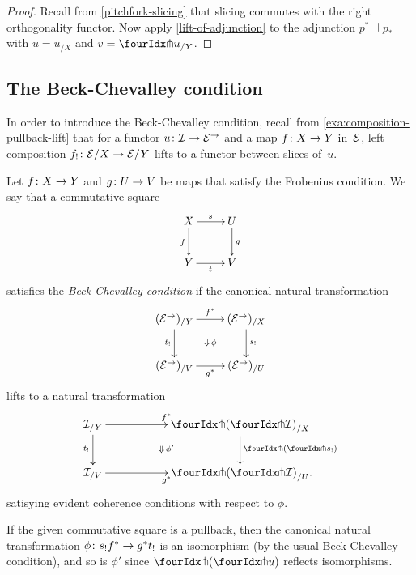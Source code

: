 \documentclass[reqno,10pt,a4paper,oneside]{amsart}
\begin{document}
\begin{proof}
Recall from \cref{pitchfork-slicing} that slicing commutes with the right orthogonality functor.
Now apply \cref{lift-of-adjunction} to the adjunction $p^* \dashv p_*$ with $u = u_{/X}$ and $v = {\liftr{u}}_{/Y}$.
\end{proof}


\subsection*{The Beck-Chevalley condition}
In order to introduce the Beck-Chevalley condition, recall from \cref{exa:composition-pullback-lift} that for a functor $u \colon \mathcal{I} \to \mathcal{E}^\to$ and a map $f \colon X \to Y$ in~$\mathcal{E}$, left composition $f_! \colon \mathcal{E}/X \to \mathcal{E}/Y$ lifts to a functor between slices of~$u$.



\begin{definition} \label{def:beck-chevalley}
Let $f \colon X \to Y$ and $g \colon U \to V$ be maps that satisfy the Frobenius condition.
We say that a commutative square
\[
\xymatrix{
  X
  \ar[d]_{f}
  \ar[r]^{s}
&
  U
  \ar[d]^{g}
\\
  Y
  \ar[r]_{t}
&
  V
}
\]
satisfies the \emph{Beck-Chevalley condition} if the canonical natural transformation
\[
\xymatrix{
  (\cal{E}^\to)_{/Y}
   \ar[d]_{t_!}
  \ar[r]^{f^*} \ar@{}[dr]|{\Downarrow \, \phi}
&
  (\cal{E}^\to)_{/X}
  \ar[d]^{s_!}
\\
  (\cal{E}^\to)_{/V}
  \ar[r]_{g^*}
&
  (\cal{E}^\to)_{/U}
}
\]
lifts to a natural transformation
\[
\xymatrix@C+3em{
   \cal{I}_{/Y}
    \ar[r]^{f^*}
     \ar[d]_{t_!}
    \ar@{}[dr]|{\Downarrow \, \phi'}
   &
  {\liftl{(\liftr{\cal{I}})}}_{/X}
  \ar[d]^{\liftl{(\liftr{s_!})}} \\
  \cal{I}_{/V}
   \ar[r]_{g^*}
 &
   {\liftl{(\liftr{\cal{I}})}}_{/U} \rlap{.}
}
\]
satisying evident coherence conditions with respect to $\phi$.
\end{definition}

\begin{remark}
If the given commutative square is a pullback, then the canonical natural transformation $\phi \colon s_! f^* \to g^* t_!$ is an isomorphism (by the usual Beck-Chevalley condition), and so is $\phi'$ since $\liftl{(\liftr{u})}$ reflects isomorphisms.
\end{remark}
\end{document}
